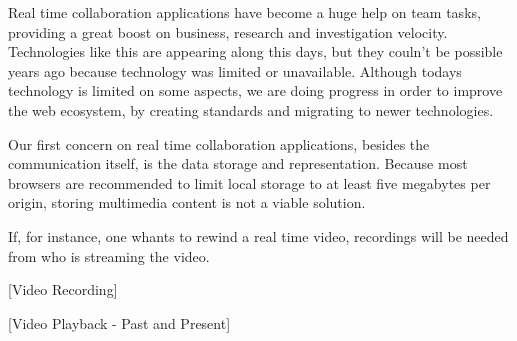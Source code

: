 
  Real time collaboration applications have become a huge help on team tasks, providing a great boost on business, research and investigation velocity. Technologies like this are appearing along this days, but they couln't be possible years ago because technology was limited or unavailable. Although todays technology is limited on some aspects, we are doing progress in order to improve the web ecosystem, by creating standards and migrating to newer technologies.

  Our first concern on real time collaboration applications, besides the communication itself, is the data storage and representation. Because most browsers are recommended to limit local storage to at least five megabytes per origin, storing multimedia content is not a viable solution.

  If, for instance, one whants to rewind a real time video, recordings will be needed from who is streaming the video. 

  {\color{red}[Video Recording]}

  {\color{red}[Video Playback - Past and Present]}




